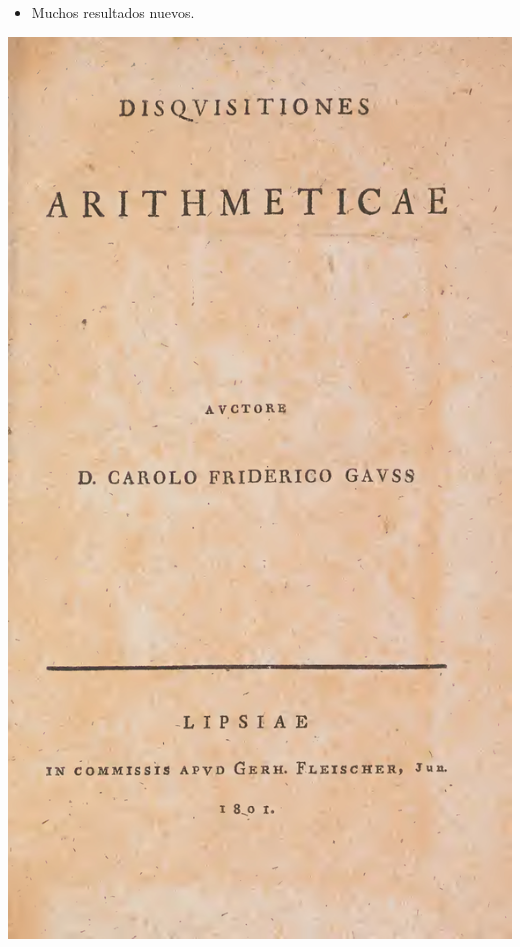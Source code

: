 \begin{frame}
\begin{minipage}[t][0.6\textheight]{0.6\textwidth}
\begin{itemize}
    \item<7-> Muchos resultados nuevos.
    \end{itemize}
  \end{minipage}
  \begin{minipage}[t]{0.35\textwidth}
    \vspace{0pt}\flushright
    \includegraphics[width=.9\textwidth]{pic/disquisitiones.jpg}
  \end{minipage}
\end{frame}

